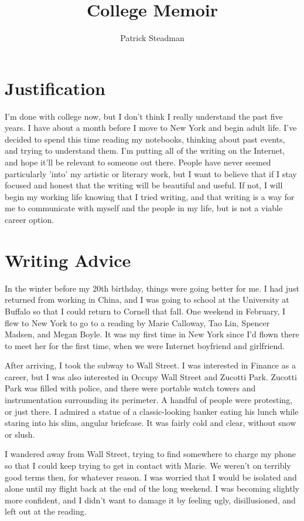 \documentclass[12pt]{article}
\title{College Memoir}
\author{Patrick Steadman}
\begin{document}
\maketitle

\section{Justification}
I'm done with college now, but I don't think I really understand the past five
years.  I have about a month before I move to New York and begin adult life.
I've decided to spend this time reading my notebooks, thinking about past
events, and trying to understand them.  I'm putting all of the writing on the
Internet, and hope it'll be relevant to someone out there.  People have never
seemed particularly 'into' my artistic or literary work, but I want to believe
that if I stay focused and honest that the writing will be beautiful and
useful.  If not, I will begin my working life knowing that I tried writing, and
that writing is a way for me to communicate with myself and the people in my
life, but is not a viable career option.

\section{Writing Advice}
In the winter before my 20th birthday, things were going better for me.  I had
just returned from working in China, and I was going to school at the University
at Buffalo so that I could return to Cornell that fall.  One weekend in
February, I flew to New York to go to a reading by Marie Calloway, Tao Lin,
Spencer Madsen, and Megan Boyle.  It was my first time in New York since I'd
flown there to meet her for the first time, when we were Internet boyfriend and
girlfriend.  

After arriving, I took the subway to Wall Street.  I was interested in Finance
as a career, but I was also interested in Occupy Wall Street and Zucotti Park.
Zucotti Park was filled with police, and there were portable watch towers and
instrumentation surrounding its perimeter.  A handful of people were protesting,
or just there.  I admired a statue of a classic-looking banker eating his lunch
while staring into his slim, angular briefcase.  It was fairly cold and clear,
without snow or slush.

I wandered away from Wall Street, trying to find somewhere to charge my phone so
that I could keep trying to get in contact with Marie.  We weren't on terribly
good terms then, for whatever reason.  I was worried that I would be isolated
and alone until my flight back at the end of the long weekend.  I was becoming
slightly more confident, and I didn't want to damage it by feeling ugly,
disillusioned, and left out at the reading.
\end{document}
